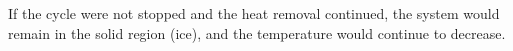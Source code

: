 If the cycle were not stopped and the heat removal continued, the system would remain in the solid region (ice), and the temperature would continue to decrease.